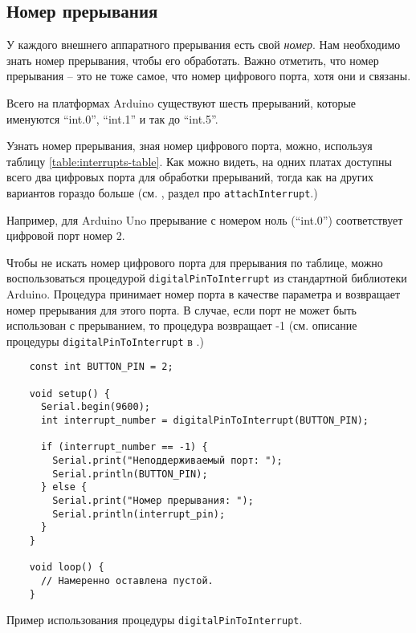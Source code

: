 \documentclass[../sparc.tex]{subfiles}
\begin{document}
\subsection{Номер прерывания}
\label{subsection:interrupts-number}

У каждого внешнего аппаратного прерывания есть свой \emph{номер}.  Нам
необходимо знать номер прерывания, чтобы его обработать.  Важно отметить, что
номер прерывания -- это не тоже самое, что номер цифрового порта, хотя они и
связаны.

Всего на платформах Arduino существуют шесть прерываний, которые именуются
``int.0'', ``int.1'' и так до ``int.5''.


Узнать номер прерывания, зная номер цифрового порта, можно, используя таблицу
\ref{table:interrupts-table}.  Как можно видеть, на одних платах доступны всего
два цифровых порта для обработки прерываний, тогда как на других вариантов
гораздо больше (см. \cite{arduino:reference}, раздел про
\texttt{attachInterrupt}.)

Например, для Arduino Uno прерывание с номером ноль (``int.0'') соответствует
цифровой порт номер 2.

Чтобы не искать номер цифрового порта для прерывания по таблице, можно
воспользоваться процедурой \texttt{digitalPinToInterrupt} из стандартной
библиотеки Arduino.  Процедура принимает номер порта в качестве параметра и
возвращает номер прерывания для этого порта.  В случае, если порт не может быть
использован с прерыванием, то процедура возвращает -1 (см. описание процедуры
\texttt{digitalPinToInterrupt} в \cite{arduino:reference}.)

\begin{listing}[H]
  \begin{verbatim}
    const int BUTTON_PIN = 2;

    void setup() {
      Serial.begin(9600);
      int interrupt_number = digitalPinToInterrupt(BUTTON_PIN);

      if (interrupt_number == -1) {
        Serial.print("Неподдерживаемый порт: ");
        Serial.println(BUTTON_PIN);
      } else {
        Serial.print("Номер прерывания: ");
        Serial.println(interrupt_pin);
      }
    }

    void loop() {
      // Намеренно оставлена пустой.
    }
  \end{verbatim}
  \caption{Пример использования процедуры \texttt{digitalPinToInterrupt}.}
  \label{listing:interrupts-digital-pin-to-interrupt}
\end{listing}
\end{document}
